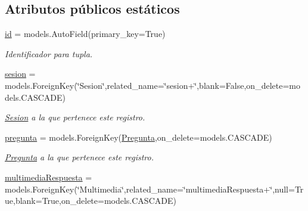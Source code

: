 \subsection*{Atributos públicos estáticos}
\begin{DoxyCompactItemize}
\item 
\hyperlink{classappEmotionIOT_1_1models_1_1Registro__Sesion_afe606eb28657ea09b49cb33124c0cbcb}{id} = models.\+Auto\+Field(primary\+\_\+key=True)\hypertarget{classappEmotionIOT_1_1models_1_1Registro__Sesion_afe606eb28657ea09b49cb33124c0cbcb}{}\label{classappEmotionIOT_1_1models_1_1Registro__Sesion_afe606eb28657ea09b49cb33124c0cbcb}

\begin{DoxyCompactList}\small\item\em Identificador para tupla. \end{DoxyCompactList}\item 
\hyperlink{classappEmotionIOT_1_1models_1_1Registro__Sesion_ad1cd9a0414d42f5d5c5f03690153eaf6}{sesion} = models.\+Foreign\+Key(\char`\"{}Sesion\char`\"{},related\+\_\+name=\char`\"{}sesion+\char`\"{},blank=False,on\+\_\+delete=models.\+C\+A\+S\+C\+A\+DE)\hypertarget{classappEmotionIOT_1_1models_1_1Registro__Sesion_ad1cd9a0414d42f5d5c5f03690153eaf6}{}\label{classappEmotionIOT_1_1models_1_1Registro__Sesion_ad1cd9a0414d42f5d5c5f03690153eaf6}

\begin{DoxyCompactList}\small\item\em \hyperlink{classappEmotionIOT_1_1models_1_1Sesion}{Sesion} a la que pertenece este registro. \end{DoxyCompactList}\item 
\hyperlink{classappEmotionIOT_1_1models_1_1Registro__Sesion_a9da6847d846155c5a771dfc04a92a0db}{pregunta} = models.\+Foreign\+Key(\hyperlink{classappEmotionIOT_1_1models_1_1Pregunta}{Pregunta},on\+\_\+delete=models.\+C\+A\+S\+C\+A\+DE)\hypertarget{classappEmotionIOT_1_1models_1_1Registro__Sesion_a9da6847d846155c5a771dfc04a92a0db}{}\label{classappEmotionIOT_1_1models_1_1Registro__Sesion_a9da6847d846155c5a771dfc04a92a0db}

\begin{DoxyCompactList}\small\item\em \hyperlink{classappEmotionIOT_1_1models_1_1Pregunta}{Pregunta} a la que pertenece este registro. \end{DoxyCompactList}\item 
\hyperlink{classappEmotionIOT_1_1models_1_1Registro__Sesion_a7ed1dfc435d3d47d197f7a1a2cdaacfa}{multimedia\+Respuesta} = models.\+Foreign\+Key(\char`\"{}Multimedia\char`\"{},related\+\_\+name=\char`\"{}multimedia\+Respuesta+\char`\"{},null=True,blank=True,on\+\_\+delete=models.\+C\+A\+S\+C\+A\+DE)\hypertarget{classappEmotionIOT_1_1models_1_1Registro__Sesion_a7ed1dfc435d3d47d197f7a1a2cdaacfa}{}\label{classappEmotionIOT_1_1models_1_1Registro__Sesion_a7ed1dfc435d3d47d197f7a1a2cdaacfa}


\end{DoxyCompactItemize}
